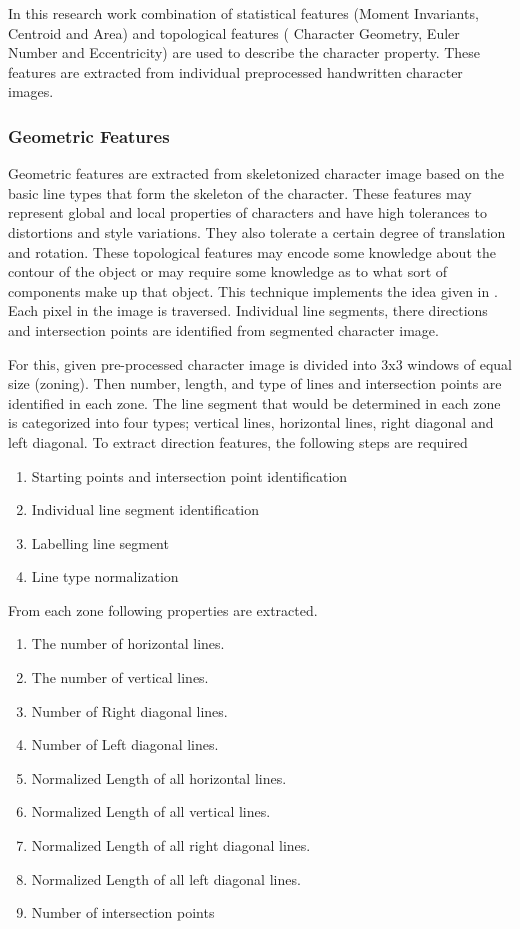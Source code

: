 \documentclass[12pt,a4paper,oneside]{article}
\numberwithin{equation}{section}
\numberwithin{algorithm}{section}
\begin{document}
	In this research work combination of statistical features (Moment Invariants, Centroid and Area) and topological features ( Character Geometry, Euler Number and Eccentricity) are used to describe the character property. These features are extracted from individual preprocessed handwritten character images.
	
	\subsubsection{Geometric Features}
	\label{geometric_features}
	Geometric features are extracted from skeletonized character image based on the basic line types that form the skeleton of the character. These features may represent global and local properties of characters and have high tolerances to distortions and style variations.  They also tolerate a certain degree of translation and rotation.  These topological features may encode some knowledge about the contour of the object or may require some knowledge as to what sort of components make up that object.
	This technique implements the idea given in \cite{Blumenstein2003}. Each pixel in the image is traversed. Individual line segments, there directions and intersection points are identified from segmented character image.
	
	For this, given pre-processed character image is divided into 3x3 windows of equal size (zoning). Then number, length, and type of lines and intersection points are identified in each zone. The line segment that would be determined in each zone is categorized into four types; vertical lines, horizontal lines, right diagonal and left diagonal.
	To extract direction features, the following steps are required
	
	\begin{enumerate}
	\item Starting points and intersection point identification
	\item Individual line segment identification
	\item Labelling line segment
	\item Line type normalization
	\end{enumerate}
	
	
	From each zone following properties are extracted.
	\begin{enumerate}
	\item The number of horizontal lines.
	\item The number of vertical lines.
	\item Number of Right diagonal lines.
	\item Number of Left diagonal lines.
	\item Normalized Length of all horizontal lines.
	\item Normalized Length of all vertical lines.
	\item Normalized Length of all right diagonal lines.
	\item Normalized Length of all left diagonal lines.
	\item Number of intersection points
	\end{enumerate}
	
\end{document}
